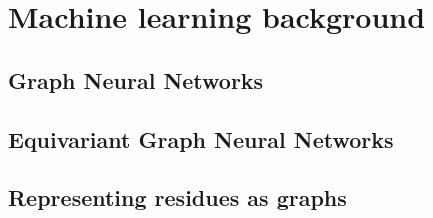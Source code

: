 \section{Machine learning background}
\subsection{Graph Neural Networks}
\subsection{Equivariant Graph Neural Networks}
\subsection{Representing residues as graphs}
